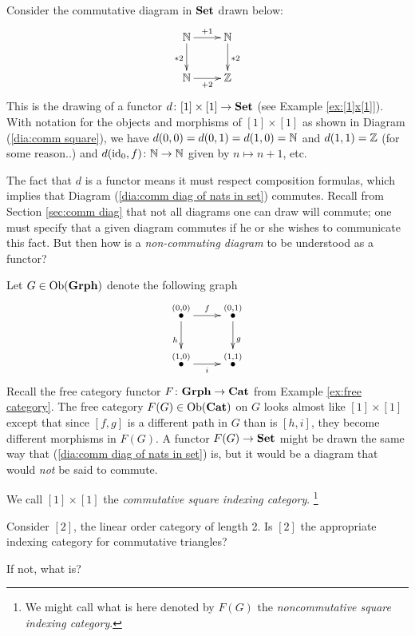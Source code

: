 \documentclass[CT4S-EN-RU]{subfiles}
\begin{document}
\begin{exampleENG}\label{ex:comm vs noncomm diags}
Consider the commutative diagram in ${\mathbf{Set}}$ drawn below:
\begin{align}\label{dia:comm diag of nats in set}
\xymatrix{\NN\ar[r]^{+1}\ar[d]_{*2}&\NN\ar[d]^{*2}\\\NN\ar[r]_{+2}&\ZZ}
\end{align}
This is the drawing of a functor $d\colon[1]\times[1]\rightarrow{\mathbf{Set}}$ (see Example \ref{ex:[1]x[1]}). With notation for the objects and morphisms of $[1]\times[1]$ as shown in Diagram (\ref{dia:comm square}), we have $d(0,0)=d(0,1)=d(1,0)={\mathbb N}$ and $d(1,1)={\mathbb Z}$ (for some reason..) and $d(\textnormal{id}_0,f)\colon{\mathbb N}\rightarrow{\mathbb N}$ given by $n\mapsto n+1$, etc. 

The fact that $d$ is a functor means it must respect composition formulas, which implies that Diagram (\ref{dia:comm diag of nats in set}) commutes. Recall from Section \ref{sec:comm diag} that not all diagrams one can draw will commute; one must specify that a given diagram commutes if he or she wishes to communicate this fact. But then how is a {\em non-commuting diagram} to be understood as a functor?

Let $G\in\textnormal{Ob}({\mathbf{Grph}})$ denote the following graph 
$$\xymatrix{\LMO{(0,0)}\ar[r]^f\ar[d]_h&\LMO{(0,1)}\ar[d]^{g}\\\LMO{(1,0)}\ar[r]_{i}&\LMO{(1,1)}}$$
Recall the free category functor $F\colon{\mathbf{Grph}}\rightarrow{\mathbf{Cat}}$ from Example \ref{ex:free category}. The free category $F(G)\in\textnormal{Ob}({\mathbf{Cat}})$ on $G$ looks almost like $[1]\times[1]$ except that since $[f,g]$ is a different path in $G$ than is $[h,i]$, they become different morphisms in $F(G)$. A functor $F(G)\rightarrow{\mathbf{Set}}$ might be drawn the same way that (\ref{dia:comm diag of nats in set}) is, but it would be a diagram that would {\em not} be said to commute.

We call $[1]\times [1]$ the {\em commutative square indexing category}. 
\footnote{We might call what is here denoted by $F(G)$ the {\em noncommutative square indexing category}.}
\end{exampleENG}

\begin{exampleRUS}\label{ex:comm vs noncomm diags}
\end{exampleRUS}

\begin{exerciseENG}
Consider $[2]$, the linear order category of length 2.
\sexc Is $[2]$ the appropriate indexing category for commutative triangles?
\item If not, what is?
\endsexc
\end{exerciseENG}
\end{document}
